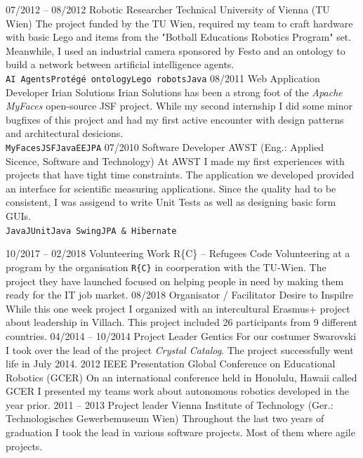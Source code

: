 \documentclass[9pt]{developercv} %
\begin{document}

\begin{entrylist}
	\entry
	{07/2012 -- 08/2012}
	{Robotic Researcher}
	{Technical University of Vienna (TU Wien)}
	{The project funded by the TU Wien, required my team to craft hardware with basic Lego and items from the "Botball Educations Robotics Program" set. Meanwhile, I used an industrial camera sponsored by Festo and an ontology to build a network between artificial intelligence agents.\\ 
		\texttt{AI Agents}\slashsep\texttt{Protégé ontology}\slashsep\texttt{Lego robots}\slashsep\texttt{Java}}
	\entry
	{08/2011}
	{Web Application Developer}
	{Irian Solutions}
	{Irian Solutions has been a strong foot of the \textit{Apache MyFaces} open-source JSF project. While my second internship I did some minor bugfixes of this project and had my first active encounter with design patterns and architectural desicions.\\ 
		\texttt{MyFaces}\slashsep\texttt{JSF}\slashsep\texttt{JavaEE}\slashsep\texttt{JPA}}
	\entry
	{07/2010}
	{Software Developer}
	{AWST (Eng.: Applied Sicence, Software and Technology)}
	{At AWST I made my first experiences with projects that have tight time constraints. The application we developed provided an interface for scientific measuring applications. Since the quality had to be consistent, I was assigend to write Unit Tests as well as designing basic form GUIs.  \\ 
	\texttt{Java}\slashsep\texttt{JUnit}\slashsep\texttt{Java Swing}\slashsep\texttt{JPA \& Hibernate}}
\end{entrylist}


\begin{entrylist}
	\entry
	{10/2017 -- 02/2018}
	{Volunteering Work}
	{R\{C\} -- Refugees Code}
	{Volunteering at a program by the organisation \texttt{R\{C\}} in coorperation with the TU-Wien. The project they have launched focused on helping people in need by making them ready for the IT job market.}
	\entry
	{08/2018}
	{Organisator / Facilitator}
	{Desire to Inspilre}
	{While this one week project I organized with  an intercultural Erasmus+ project about leadership in Villach. This project included 26 participants from 9 different countries.}
	\entry
	{04/2014 -- 10/2014}
	{Project Leader}
	{Gentics}
	{For our costumer Swarovski I took over the lead of the project \textit{Crystal Catalog}. The project successfully went life in July 2014.}
	\entry
	{2012}
	{IEEE Presentation}
	{Global Conference on Educational Robotics (GCER)}
	{On an international conference held in Honolulu, Hawaii called GCER I presented my teams work about autonomous robotics developed in the year prior.}
	\entry
	{2011 -- 2013}
	{Project leader}
	{Vienna Institute of Technology (Ger.: Technologisches Gewerbemuseum Wien)}
	{Throughout the last two years of graduation I took the lead in various software projects. Most of them where agile projects.}
\end{entrylist}
\end{document}
